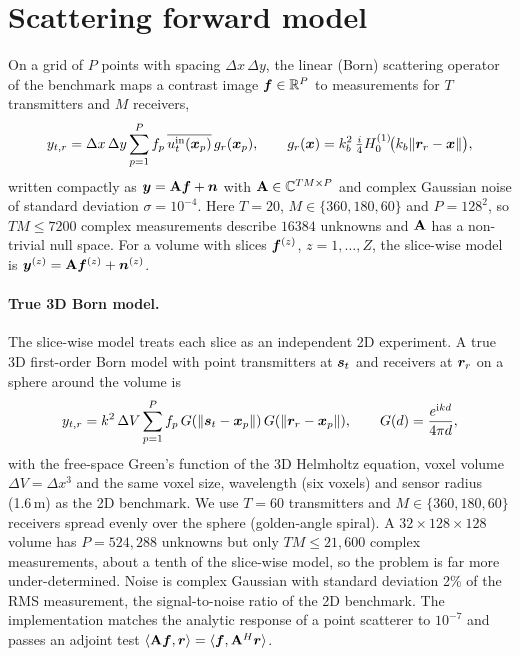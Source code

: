 \section{Scattering forward model}
On a grid of $P$ points with spacing $\Delta x\,\Delta y$, the linear (Born) scattering operator of the benchmark maps
a contrast image $\bm{f}\in\mathbb{R}^P$ to measurements for $T$ transmitters and $M$ receivers,
\begin{equation}
  y_{t,r} = \Delta x\,\Delta y \sum_{p=1}^{P} f_p\,\overline{u^{\mathrm{in}}_t(\bm{x}_p)}\,g_r(\bm{x}_p),
  \qquad g_r(\bm{x}) = k_b^2\,\tfrac{i}{4}H_0^{(1)}\!\big(k_b\lVert\bm{r}_r-\bm{x}\rVert\big),
  \label{eq:born}
\end{equation}
written compactly as $\bm{y}=\mathbf{A}\bm{f}+\bm{n}$ with $\mathbf{A}\in\mathbb{C}^{TM\times P}$ and complex Gaussian noise of
standard deviation $\sigma=10^{-4}$. Here $T=20$, $M\in\{360,180,60\}$ and $P=128^2$, so $TM\le7200$ complex
measurements describe $16384$ unknowns and $\mathbf{A}$ has a non-trivial null space. For a volume with slices
$\bm{f}^{(z)}$, $z=1,\dots,Z$, the slice-wise model is $\bm{y}^{(z)}=\mathbf{A}\bm{f}^{(z)}+\bm{n}^{(z)}$.

\paragraph{True 3D Born model.} The slice-wise model treats each slice as an independent 2D experiment. A true 3D
first-order Born model with point transmitters at $\bm{s}_t$ and receivers at $\bm{r}_r$ on a sphere around the
volume is
\begin{equation}
  y_{t,r} = k^2\,\Delta V \sum_{p=1}^{P} f_p\, G(\lVert\bm{s}_t-\bm{x}_p\rVert)\, G(\lVert\bm{r}_r-\bm{x}_p\rVert),
  \qquad G(d)=\frac{e^{\mathrm{i}kd}}{4\pi d},
  \label{eq:born3d}
\end{equation}
with the free-space Green's function of the 3D Helmholtz equation, voxel volume $\Delta V=\Delta x^3$ and the same
voxel size, wavelength (six voxels) and sensor radius (1.6\,m) as the 2D benchmark. We use $T=60$ transmitters and
$M\in\{360,180,60\}$ receivers spread evenly over the sphere (golden-angle spiral). A $32\times128\times128$ volume has
$P=524{,}288$ unknowns but only $TM\le21{,}600$ complex measurements, about a tenth of the slice-wise model, so the
problem is far more under-determined. Noise is complex Gaussian with standard deviation 2\% of the RMS measurement,
the signal-to-noise ratio of the 2D benchmark. The implementation matches the analytic response of a point scatterer
to $10^{-7}$ and passes an adjoint test $\langle\mathbf{A}\bm{f},\bm{r}\rangle=\langle\bm{f},\mathbf{A}^H\bm{r}\rangle$.


